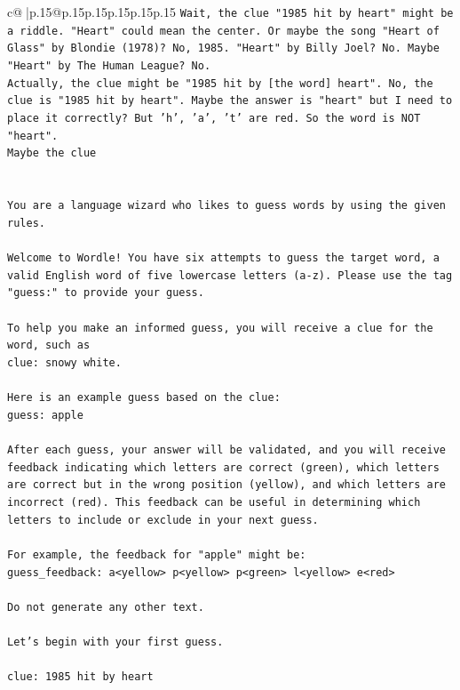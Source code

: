 \documentclass{article}
\begin{document}
{\begin{supertabular}{c@{$\;$}|p{.15\linewidth}@{}p{.15\linewidth}p{.15\linewidth}p{.15\linewidth}p{.15\linewidth}p{.15\linewidth}}
{{{\texttt{Wait, the clue "1985 hit by heart" might be a riddle. "Heart" could mean the center. Or maybe the song "Heart of Glass" by Blondie (1978)? No, 1985. "Heart" by Billy Joel? No. Maybe "Heart" by The Human League? No.} \\
\texttt{Actually, the clue might be "1985 hit by {[}the word{]} heart". No, the clue is "1985 hit by heart". Maybe the answer is "heart" but I need to place it correctly? But 'h', 'a', 't' are red. So the word is NOT "heart".} \\
\texttt{Maybe the clue} \\
\\ 
\\ 
\texttt{You are a language wizard who likes to guess words by using the given rules.} \\
\\ 
\texttt{Welcome to Wordle! You have six attempts to guess the target word, a valid English word of five lowercase letters (a{-}z). Please use the tag "guess:" to provide your guess.} \\
\\ 
\texttt{To help you make an informed guess, you will receive a clue for the word, such as} \\
\texttt{clue: snowy white.} \\
\\ 
\texttt{Here is an example guess based on the clue: } \\
\texttt{guess: apple} \\
\\ 
\texttt{After each guess, your answer will be validated, and you will receive feedback indicating which letters are correct (green), which letters are correct but in the wrong position (yellow), and which letters are incorrect (red). This feedback can be useful in determining which letters to include or exclude in your next guess.} \\
\\ 
\texttt{For example, the feedback for "apple" might be:} \\
\texttt{guess\_feedback: a<yellow> p<yellow> p<green> l<yellow> e<red>} \\
\\ 
\texttt{Do not generate any other text.} \\
\\ 
\texttt{Let's begin with your first guess.} \\
\\ 
\texttt{clue: 1985 hit by heart} \\
            }
        }
    }
     \\ \\


\end{supertabular}}
\end{document}
